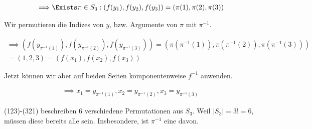 \begin{solution}
\begin{enumerate}[label = \alph*.]
\begin{itemize}
        \begin{align*}
            \implies
            & \Exists \pi \in S_3: (f(y_1), f(y_2), f(y_3)) = (\pi(1), \pi(2), \pi(3)) \\
        \end{align*}

        Wir permutieren die Indizes von $y$, bzw. Argumente von $\pi$ mit $\pi^{-1}$.

        \begin{multline*}
            \implies
            (f(y_{\pi^{-1}(1)}), f(y_{\pi^{-1}(2)}), f(y_{\pi^{-1}(3)}))
            =
            (\pi(\pi^{-1}(1)), \pi(\pi^{-1}(2)), \pi(\pi^{-1}(3))) \\
            =
            (1, 2, 3)
            =
            (f(x_1), f(x_2), f(x_3))
        \end{multline*}

        Jetzt können wir aber auf beiden Seiten komponentenweise $f^{-1}$ anwenden.

        \begin{align*}
            \implies
            x_1 = y_{\pi^{-1}(1)},
            x_2 = y_{\pi^{-1}(2)},
            x_3 = y_{\pi^{-1}(3)}
        \end{align*}

        (123)-(321) beschreiben $6$ verschiedene Permutationen aus $S_3$.
        Weil $|S_3| = 3! = 6$, müssen diese bereits alle sein.
        Insbesondere, ist $\pi^{-1}$ eine davon.

    \end{itemize}

\end{enumerate}

\end{solution}

